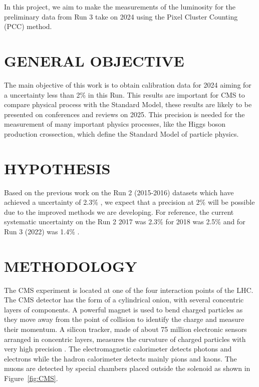 \documentclass[final,12p]{article}
\begin{document}
In this project, we aim to make the measurements of the luminosity for the preliminary data from Run 3 take on 2024 using the Pixel Cluster Counting (PCC) method. 

\section{GENERAL OBJECTIVE}


The main objective of this work is to obtain calibration data for 2024 aiming for a uncertainty less than 2\% in this Run. This results are important for CMS to compare physical process with the Standard Model, these results are likely to be presented on conferences and reviews on 2025.
This precision is needed for the measurement of many important physics processes, like the Higgs boson production crossection, which define the Standard Model of particle physics. 

\section{HYPOTHESIS}


Based on the previous work on the Run 2 (2015-2016) datasets which have achieved a uncertainty of  2.3\% \cite{Collaboration:121}, we expect that a precision at 2\% will be possible due to the improved methods we are developing.
For reference, the current systematic uncertainty on the Run 2 2017 was 2.3\% \cite{CMS:2018elu} for 2018 was 2.5\% \cite{CMS:2018} and for Run 3 (2022) was 1.4\% \cite{Collaboration:124}. 



\section{METHODOLOGY}


The CMS experiment is located at one of the four interaction points of the LHC.
The CMS detector has the form of a cylindrical onion, with several concentric layers of components.
A powerful magnet is used to bend charged particles as they move away from the point of collision to identify the charge and measure their momentum.
A silicon tracker, made of about 75 million electronic sensors arranged in concentric layers, measures the curvature of charged particles with very high precision \cite{Chatrchyan:2008aa}.
The electromagnetic calorimeter detects photons and electrons while the hadron calorimeter detects mainly pions and kaons.
The muons are detected by special chambers placed outside the solenoid as shown in Figure~\ref{fig:CMS}.
\end{document}
